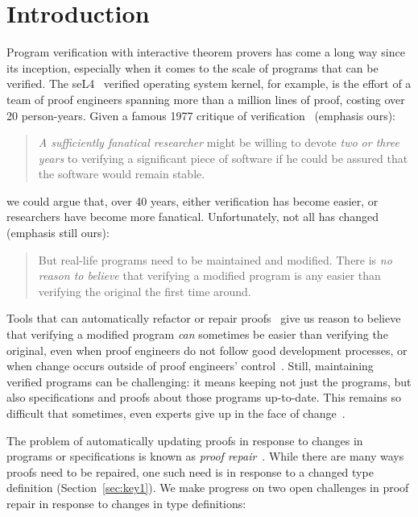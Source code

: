 \section{Introduction}

Program verification with interactive theorem provers has come a long way since its inception,
especially when it comes to the scale of programs that can be verified.
The seL4~\cite{Klein2009} verified operating system kernel, for example,
is the effort of a team of proof engineers spanning more than
a million lines of proof, costing over 20 person-years.
Given a famous 1977 critique of verification~\cite{DeMillo1977} (emphasis ours):

\begin{quote}
\textit{A sufficiently fanatical researcher}
might be willing to devote \textit{two or 
three years} to verifying a significant 
piece of software if he could be 
assured that the software would remain stable.
\end{quote}
we could argue that, over 40 years, either verification has become easier,
or researchers have become more fanatical. Unfortunately, not all has changed (emphasis still ours):

\begin{quote}
But real-life programs need to 
be maintained and modified. 
There is \textit{no reason to believe} that verifying a modified program is any 
easier than verifying the original the 
first time around.
\end{quote}
Tools that can automatically refactor or repair proofs~\cite{wibergh2019, WhitesidePhD, Dietrich2013, adams2015, Bourke12, Roe2016, robert2018, pumpkinpatch}
give us reason to believe that verifying a modified program \textit{can} sometimes be easier than verifying the original, even when proof engineers do not follow good development processes,
or when change occurs outside of proof engineers' control~\cite{PGL-045}.
Still, maintaining verified programs can be challenging: it means keeping not just the programs, but also specifications and proofs about those programs up-to-date.
This remains so difficult that sometimes, even experts give up in the face of change~\cite{replica}.

The problem of automatically updating proofs in response to changes in programs or specifications is known as \textit{proof repair}~\cite{PGL-045, pumpkinpatch}.
While there are many ways proofs need to be repaired, one such need is in response to a changed type definition (Section~\ref{sec:key1}).
We make progress on two open challenges in proof repair in response to changes in type definitions:

